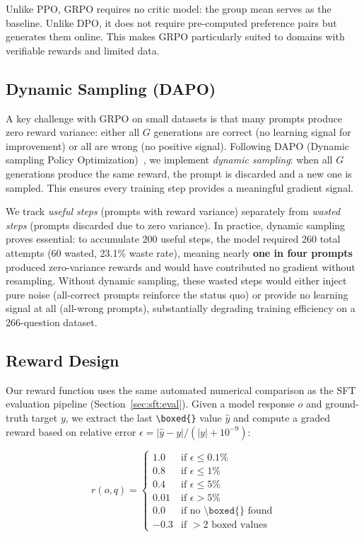 Unlike PPO, GRPO requires no critic model: the group mean serves as the baseline. Unlike DPO, it does not require pre-computed preference pairs but generates them online. This makes GRPO particularly suited to domains with verifiable rewards and limited data.

\subsection{Dynamic Sampling (DAPO)}
\label{sec:grpo:dapo}

A key challenge with GRPO on small datasets is that many prompts produce zero reward variance: either all $G$ generations are correct (no learning signal for improvement) or all are wrong (no positive signal). Following DAPO (Dynamic sampling Policy Optimization)~\cite{yu2025dapo}, we implement \emph{dynamic sampling}: when all $G$ generations produce the same reward, the prompt is discarded and a new one is sampled. This ensures every training step provides a meaningful gradient signal.

We track \emph{useful steps} (prompts with reward variance) separately from \emph{wasted steps} (prompts discarded due to zero variance). In practice, dynamic sampling proves essential: to accumulate 200 useful steps, the model required 260 total attempts (60 wasted, 23.1\% waste rate), meaning nearly \textbf{one in four prompts} produced zero-variance rewards and would have contributed no gradient without resampling. Without dynamic sampling, these wasted steps would either inject pure noise (all-correct prompts reinforce the status quo) or provide no learning signal at all (all-wrong prompts), substantially degrading training efficiency on a 266-question dataset.

\subsection{Reward Design}
\label{sec:grpo:reward}

Our reward function uses the same automated numerical comparison as the SFT evaluation pipeline (Section~\ref{sec:sft:eval}). Given a model response $o$ and ground-truth target $y$, we extract the last \verb|\boxed{}| value $\hat{y}$ and compute a graded reward based on relative error $\epsilon = |\hat{y} - y| / (|y| + 10^{-9})$:

\begin{equation}
    r(o, q) = \begin{cases}
        1.0 & \text{if } \epsilon \leq 0.1\% \\
        0.8 & \text{if } \epsilon \leq 1\% \\
        0.4 & \text{if } \epsilon \leq 5\% \\
        0.01 & \text{if } \epsilon > 5\% \\
        0.0 & \text{if no } \texttt{\textbackslash boxed\{\}} \text{ found} \\
        -0.3 & \text{if } > 2 \text{ boxed values}
    \end{cases}
    \label{eq:reward}
\end{equation}

